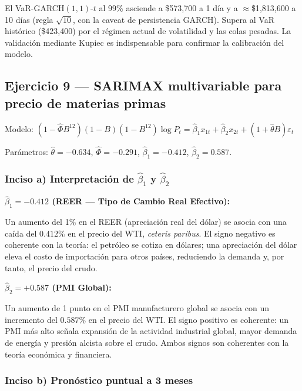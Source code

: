 \documentclass[12pt,a4paper]{article}
\begin{document}
\begin{hallazgo}
El VaR-GARCH$(1,1)$-$t$ al 99\% asciende a \$573{,}700 a 1 día y a $\approx$\$1{,}813{,}600 a 10 días (regla $\sqrt{10}$, con la caveat de persistencia GARCH). Supera al VaR histórico (\$423{,}400) por el régimen actual de volatilidad y las colas pesadas. La validación mediante Kupiec es indispensable para confirmar la calibración del modelo.
\end{hallazgo}

\subsection{Ejercicio 9 — SARIMAX multivariable para precio de materias primas}

Modelo: $(1-\hat{\Phi}B^{12})(1-B)(1-B^{12})\log P_t = \hat{\beta}_1 x_{1t}+\hat{\beta}_2 x_{2t}+(1+\hat{\theta}B)\varepsilon_t$

Parámetros: $\hat{\theta}=-0.634$, $\hat{\Phi}=-0.291$, $\hat{\beta}_1=-0.412$, $\hat{\beta}_2=0.587$.

\subsubsection*{Inciso a) Interpretación de $\hat{\beta}_1$ y $\hat{\beta}_2$}

\begin{solucion}
\textbf{$\hat{\beta}_1=-0.412$ (REER — Tipo de Cambio Real Efectivo):}

Un aumento del 1\% en el REER (apreciación real del dólar) se asocia con una caída del $0.412\%$ en el precio del WTI, \emph{ceteris paribus}. El signo negativo es coherente con la teoría: el petróleo se cotiza en dólares; una apreciación del dólar eleva el costo de importación para otros países, reduciendo la demanda y, por tanto, el precio del crudo.

\textbf{$\hat{\beta}_2=+0.587$ (PMI Global):}

Un aumento de 1 punto en el PMI manufacturero global se asocia con un incremento del $0.587\%$ en el precio del WTI. El signo positivo es coherente: un PMI más alto señala expansión de la actividad industrial global, mayor demanda de energía y presión alcista sobre el crudo. Ambos signos son coherentes con la teoría económica y financiera.
\end{solucion}

\subsubsection*{Inciso b) Pronóstico puntual a 3 meses}
\end{document}
